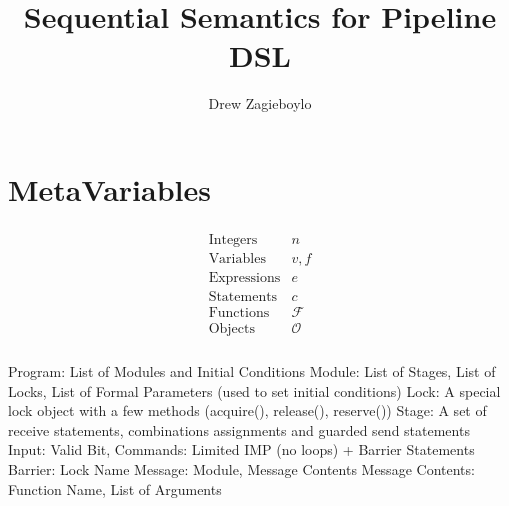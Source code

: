 \documentclass{article}
\begin{document}
\title{Sequential Semantics for Pipeline DSL}
\author{Drew Zagieboylo}
\maketitle

\section{MetaVariables}
\begin{align*}
  \begin{array}{lc}
    \mbox{Integers} & n \\
    \mbox{Variables} & v,f\\
    \mbox{Expressions} & e\\
    \mbox{Statements} & c\\
    \mbox{Functions} & \mathcal{F}\\
    \mbox{Objects} & \mathcal{O}\\
  \end{array}
\end{align*}

Program: List of Modules and Initial Conditions
Module: List of Stages, List of Locks, List of Formal Parameters (used to set initial conditions)
Lock: A special lock object with a few methods (acquire(), release(), reserve())
Stage: A set of receive statements, combinations assignments and guarded send statements
Input: Valid Bit, 
Commands: Limited IMP (no loops) + Barrier Statements
Barrier: Lock Name
Message: Module, Message Contents
Message Contents: Function Name, List of Arguments

\begin{figure}[h]
\begin{syntax}
  







\end{syntax}
\end{figure}
\end{document}

